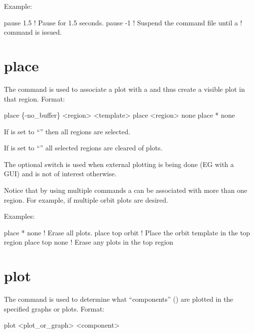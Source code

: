 Example:
\begin{example}
  pause 1.5    ! Pause for 1.5 seconds.
  pause -1     ! Suspend the command file until a  
               !   command is issued.
\end{example}

\section{place}
\label{s:place}

The  command is used to associate a  plot with a 
and thus create a visible plot in that region. Format:
\begin{example}
  place \{-no_buffer\} <region> <template>
  place <region> none
  place * none
\end{example}

\vskip 10pt 

If  is set to ``\vn{*}'' then all regions are selected.

If  is set to ``'' all selected regions are cleared of plots.

The  optional switch is used when external plotting is being done (EG with a GUI) and
is not of interest otherwise.

Notice that by using multiple  commands a  can be associated with more than
one region. For example, if multiple orbit plots are desired.

Examples:
\begin{example}
  place * none     ! Erase all plots.
  place top orbit  ! Place the orbit template in the top region
  place top none   ! Erase any plots in the top region
\end{example}

\section{plot}
\label{s:plot}

The  command is used to determine what ``components'' () are
plotted in the specified graphs or plots. Format:
\begin{example}
  plot <plot_or_graph> <component>
\end{example}

